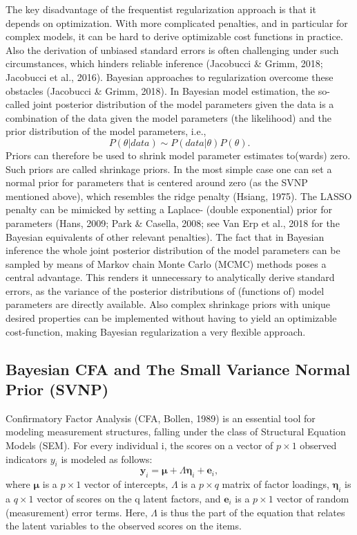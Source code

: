 \documentclass[
  man, donotrepeattitle,floatsintext]{apa6}
\begin{document}
The key disadvantage of the frequentist regularization approach is that
it depends on optimization. With more complicated penalties, and in
particular for complex models, it can be hard to derive optimizable cost
functions in practice. Also the derivation of unbiased standard errors
is often challenging under such circumstances, which hinders reliable
inference (Jacobucci \& Grimm, 2018; Jacobucci et al., 2016).
Bayesian approaches to regularization overcome these obstacles
(Jacobucci \& Grimm, 2018). In Bayesian model estimation, the
so-called joint posterior distribution of the model parameters given the
data is a combination of the data given the model parameters (the
likelihood) and the prior distribution of the model parameters, i.e.,
\[P({\theta} | data) \sim  P(data | \theta) P(\theta) .\] Priors can
therefore be used to shrink model parameter estimates to(wards) zero.
Such priors are called shrinkage priors. In the most simple case one can
set a normal prior for parameters that is centered around zero (as the
SVNP mentioned above), which resembles the ridge penalty
(Hsiang, 1975). The LASSO penalty can be mimicked by setting a
Laplace- (double exponential) prior for parameters (Hans, 2009; Park \& Casella, 2008; see Van Erp et al., 2018 for the Bayesian
equivalents of other relevant penalties). The fact that in Bayesian
inference the whole joint posterior distribution of the model parameters
can be sampled by means of Markov chain Monte Carlo (MCMC) methods poses
a central advantage. This renders it unnecessary to analytically derive
standard errors, as the variance of the posterior distributions of
(functions of) model parameters are directly available. Also complex shrinkage priors with
unique desired properties can be implemented without having to yield an
optimizable cost-function, making Bayesian regularization a very
flexible approach.

\subsection{Bayesian CFA and The Small Variance Normal Prior (SVNP)}\label{bayesian-cfa-and-the-small-variance-normal-prior-svnp}

Confirmatory Factor Analysis (CFA, Bollen, 1989) is an
essential tool for modeling measurement structures, falling under the
class of Structural Equation Models (SEM). For every individual i, the
scores on a vector of \(p \times 1\) observed indicators \(y_i\) is modeled
as follows:
\[\boldsymbol{y}_i = \boldsymbol{\mu} + \Lambda \boldsymbol{\eta}_i + \boldsymbol{e}_i ,\]
where \(\boldsymbol{\mu}\) is a \(p \times 1\) vector of intercepts,
\(\Lambda\) is a \(p \times q\) matrix of factor loadings,
\(\boldsymbol{\eta}_i\) is a \(q \times 1\) vector of scores on the q latent
factors, and \(\boldsymbol{e}_i\) is a \(p \times 1\) vector of random
(measurement) error terms. Here, \(\Lambda\) is thus the part of the
equation that relates the latent variables to the observed scores on the
items.
\end{document}
